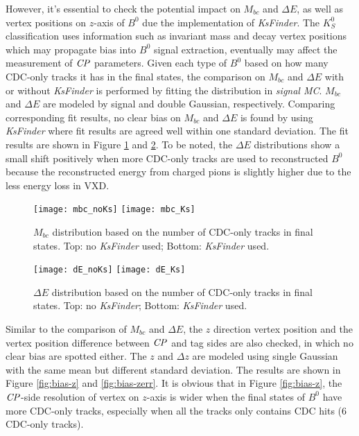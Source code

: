  However, it's essential to check the potential impact on $M_{bc}$ and $\Delta E$, as well as vertex positions on $z$-axis of $B^0$ due the implementation of \textit{KsFinder}. The $K_S^0$ classification uses information such as invariant mass and decay vertex positions which may propagate bias into $B^0$ signal extraction, eventually may affect the measurement of $\it{CP}$ parameters. Given each type of $B^0$ based on how many CDC-only tracks it has in the final states, the comparison on $M_{bc}$ and $\Delta{E}$ with or without \textit{KsFinder} is performed by fitting the distribution in \textit{signal MC}. $M_{bc}$ and $\Delta{E}$ are modeled by signal and double Gaussian, respectively. Comparing corresponding fit results, no clear bias on $M_{bc}$ and $\Delta{E}$ is found by using \textit{KsFinder} where fit results are agreed well within one standard deviation. The fit results are shown in Figure \ref{fig:mbc_bias} and \ref{fig:de_bias}. To be noted, the $\Delta E$ distributions show a small shift positively when more CDC-only tracks are used to reconstructed $B^0$ because the reconstructed energy from charged pions is slightly higher due to the less energy loss in VXD.
 
 \begin{figure}[htpb]
 	\centering
 	\texttt{[image: mbc\_noKs]}
 	\texttt{[image: mbc\_Ks]}
 	\caption{$M_{bc}$ distribution based on the number of CDC-only tracks in final states. Top: no \textit{KsFinder} used; Bottom: \textit{KsFinder} used.}
 	\label{fig:mbc_bias}
 \end{figure}
 \begin{figure}[htpb]
	\centering
	\texttt{[image: dE\_noKs]}
	\texttt{[image: dE\_Ks]}
	\caption{$\Delta{E}$ distribution based on the number of CDC-only tracks in final states. Top: no \textit{KsFinder}; Bottom: \textit{KsFinder} used.}
	\label{fig:de_bias}
\end{figure}

Similar to the comparison of $M_{bc}$ and $\Delta{E}$, the $z$ direction vertex position and the vertex position difference between $\it{CP}$ and tag sides are also checked, in which no clear bias are spotted either. The $z$ and $\Delta z$ are modeled using single Gaussian with the same mean but different standard deviation. The results are shown in Figure \ref{fig:bias-z} and \ref{fig:bias-zerr}. It is obvious that in Figure \ref{fig:bias-z}, the $\it{CP}$-side resolution of vertex on $z$-axis is wider when the final states of $B^0$ have more CDC-only tracks, especially when all the tracks only contains CDC hits (6 CDC-only tracks).  

